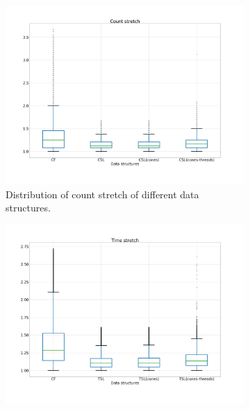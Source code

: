 \begin{figure}
{\centering
\begin{subfigure}{.33\textwidth}
  \centering
  \includegraphics[width=\linewidth]{../LERT-src/sigmod20_figs/countstretch-dist.png}
  \captionsetup{margin=.5cm}
  \caption{Distribution of count stretch of different
  data structures.}
  \label{fig:countstretch}
\end{subfigure}
%
\begin{subfigure}{.33\textwidth}
  \centering
  \includegraphics[width=\linewidth]{../LERT-src/sigmod20_figs/timestretch-dist.png}

\end{subfigure}}
\end{figure}
